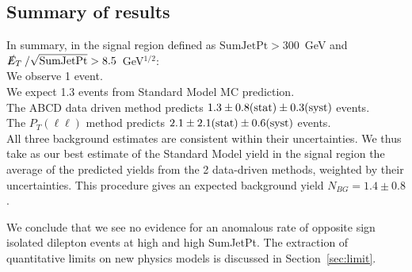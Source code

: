 \subsection{Summary of results}

In summary, in the signal region defined as $\mathrm{SumJetPt}>300$~GeV and $\met/\sqrt{\rm SumJetPt} > 8.5$~GeV$^{1/2}$:\\ 
We observe 1 event. \\
We expect 1.3 events from Standard Model MC prediction. \\
The ABCD data driven method predicts $1.3 \pm 0.8({\rm stat}) \pm 0.3({\rm syst})$ events. \\
The  $P_T(\ell\ell)$ method predicts $2.1 \pm 2.1({\rm stat}) \pm 0.6({\rm syst})$ events. \\
  
All three background estimates are consistent within their uncertainties.
We thus take as our best estimate of the Standard Model yield in 
the signal region the average of the predicted yields from the 2 data-driven methods, 
weighted by their uncertainties.
This procedure gives an expected background yield $N_{BG}=1.4 \pm 0.8$.

We conclude that we see no evidence for an anomalous 
rate of opposite sign isolated dilepton events
at high \met and high SumJetPt.  The extraction of 
quantitative limits on new physics models is discussed
in Section~\ref{sec:limit}.
